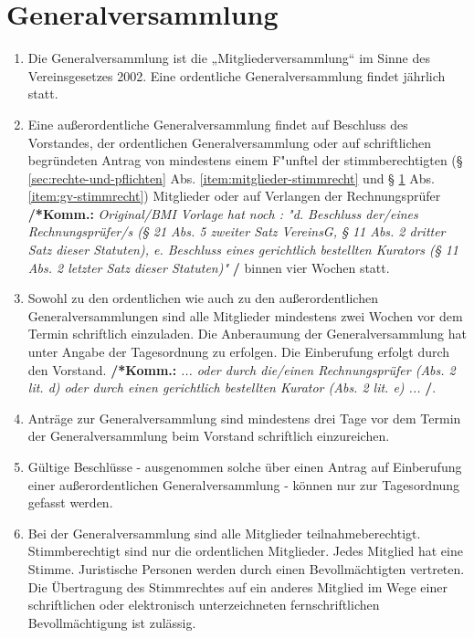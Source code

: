 \documentclass[a4paper,12pt]{article}
\newcommand{\comment}[1]{{\bf /*Komm.:} \textit{#1} {\bf */}}
\begin{document}
\section{Generalversammlung} %
\label{sec:generalversammlung}
\begin{enumerate}
\item Die Generalversammlung ist die „Mitgliederversammlung“ im Sinne des Vereinsgesetzes 2002. Eine ordentliche Generalversammlung findet jährlich statt.
\item Eine außerordentliche Generalversammlung findet auf Beschluss des Vorstandes, der ordentlichen Generalversammlung oder
auf schriftlichen begründeten Antrag von mindestens einem F"unftel der stimmberechtigten (§ \ref{sec:rechte-und-pflichten} Abs. \ref{item:mitglieder-stimmrecht} und § \ref{sec:generalversammlung} Abs. \ref{item:gv-stimmrecht}) Mitglieder
oder auf Verlangen der Rechnungsprüfer
\comment{Original/BMI Vorlage hat noch : "d. Beschluss der/eines Rechnungsprüfer/s (§ 21 Abs. 5 zweiter Satz VereinsG, § 11 Abs. 2 dritter Satz dieser Statuten),
e. Beschluss eines gerichtlich bestellten Kurators (§ 11 Abs. 2 letzter Satz dieser Statuten)"}
binnen vier Wochen statt.
\item Sowohl zu den ordentlichen wie auch zu den außerordentlichen Generalversammlungen sind alle Mitglieder mindestens zwei Wochen vor dem Termin schriftlich einzuladen. Die Anberaumung der Generalversammlung hat unter Angabe der Tagesordnung zu erfolgen. Die Einberufung erfolgt durch den Vorstand.
\comment{... oder durch die/einen Rechnungsprüfer (Abs. 2 lit. d) oder durch einen gerichtlich bestellten Kurator (Abs. 2 lit. e) ...}.

\item Anträge zur Generalversammlung sind mindestens drei Tage vor dem Termin der Generalversammlung beim Vorstand schriftlich einzureichen.

\item Gültige Beschlüsse - ausgenommen solche über einen Antrag auf Einberufung einer außerordentlichen Generalversammlung - können nur zur Tagesordnung gefasst werden.

\item \label{item:gv-stimmrecht} Bei der Generalversammlung sind alle Mitglieder teilnahmeberechtigt.
Stimmberechtigt sind nur die ordentlichen Mitglieder.
Jedes Mitglied hat eine Stimme.
Juristische Personen werden durch einen Bevollmächtigten vertreten.
Die Übertragung des Stimmrechtes auf ein anderes Mitglied im Wege einer schriftlichen oder elektronisch unterzeichneten fernschriftlichen Bevollmächtigung ist zulässig.


\end{enumerate}
\end{document}
